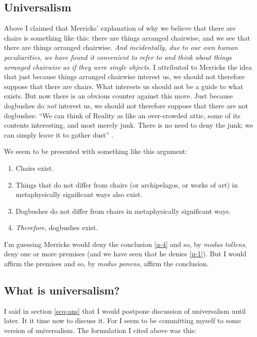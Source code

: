 \documentclass[11pt]{article}
\begin{document}
\begin{spacing}{1.25}
\section{Universalism}
\label{universalism}
Above I claimed that Merricks' explanation of why we believe that
there are chairs is something like this: there are things arranged
chairwise, and we see that there are things arranged chairwise.  {\em
  And incidentally, due to our own human peculiarities, we have found
  it convenient to refer to and think about things arranged chairwise
  as if they were single objects}.  I attributed to Merricks the idea
that just because things arranged chairwise interest us, we should not
therefore suppose that there are chairs.  What interests us should not
be a guide to what exists.  But now there is an obvious counter
against this move.  Just because dogbushes do {\em not} interest us,
we should not therefore suppose that there are not dogbushes: ``We can
think of Reality as like an over-crowded attic, some of its contents
interesting, and most merely junk.  There is no need to deny the junk;
we can simply leave it to gather dust'' \citep[167]{thomson1998a}.

We seem to be presented with something like this argument:

\begin{enumerate}[ref=(\arabic*)]
  \item Chairs exist. \label{u-1}
  \item Things that do not differ from chairs (or archipelagos, or
    works of art) in metaphysically significant ways also exist.
  \item Dogbushes do not differ from chairs in metaphysically
    significant ways.
  \item {\em Therefore}, dogbushes exist. \label{u-4}
\end{enumerate}

I'm guessing Merricks would deny the conclusion \ref{u-4} and so, by
{\em modus tollens}, deny one or more premises (and we have seen that
he denies \ref{u-1}).  But I would affirm the premises and so, by {\em
  modus ponens}, affirm the conclusion.

\subsection{What is universalism?}
I said in section \ref{scq-ans} that I would postpone discussion of
universalism until later.  It it time now to discuss it.  For I seem
to be committing myself to some version of universalism.  The
formulation I cited above was this:


\end{spacing}
\end{document}
